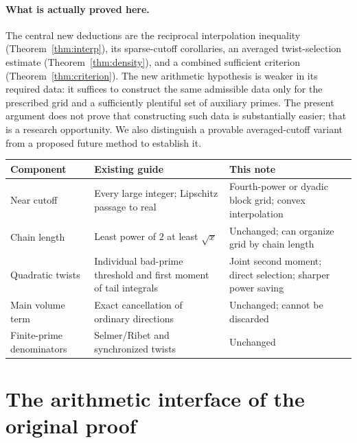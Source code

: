 \documentclass[11pt,a4paper]{article}
\theoremstyle{remark}\newtheorem{remark}[theorem]{Remark}
\begin{document}
\paragraph{What is actually proved here.} The central new deductions are the reciprocal interpolation inequality (Theorem~\ref{thm:interp}), its sparse-cutoff corollaries, an averaged twist-selection estimate (Theorem~\ref{thm:density}), and a combined sufficient criterion (Theorem~\ref{thm:criterion}). The new arithmetic hypothesis is weaker in its required data: it suffices to construct the same admissible data only for the prescribed grid and a sufficiently plentiful set of auxiliary primes. The present argument does not prove that constructing such data is substantially easier; that is a research opportunity. We also distinguish a provable averaged-cutoff variant from a proposed future method to establish it.

\begin{center}\small
\begin{tabularx}{\linewidth}{@{}p{.29\linewidth}XX@{}}\toprule
Component&Existing guide&This note\\\midrule
Near cutoff&Every large integer; Lipschitz passage to real&Fourth-power or dyadic block grid; convex interpolation\\
Chain length&Least power of $2$ at least $\sqrt x$&Unchanged; can organize grid by chain length\\
Quadratic twists&Individual bad-prime threshold and first moment of tail integrals&Joint second moment; direct selection; sharper power saving\\
Main volume term&Exact cancellation of ordinary directions&Unchanged; cannot be discarded\\
Finite-prime denominators&Selmer/Ribet and synchronized twists&Unchanged\\\bottomrule
\end{tabularx}
\end{center}

\section{The arithmetic interface of the original proof}\label{sec:interface}
\end{document}
